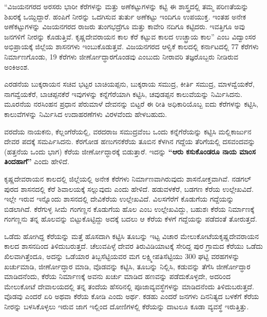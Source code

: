“ವಿಜಯನಗರದ ಅರಸರು ಭಾರೀ ಕೆರೆಗಳನ್ನು ಮತ್ತು ಅಣೆಕಟ್ಟುಗಳನ್ನು ಕಟ್ಟಿ ಈ ಶಾಸ್ತ್ರದಲ್ಲಿ ತಮ್ಮ ಪರಿಣತೆಯನ್ನು ಶಿಖರಕ್ಕೆ ಒಯ್ದಿದ್ದಾರೆ. ಹಂಪಿಗೆ ನೀರನ್ನು ಒದಗಿಸುವ ತುರ್ತು ಅಣೆಕಟ್ಟು ಇಂದಿಗೂ ಉಪಯುಕ್ತ. ಇಂತಹ ಅನೇಕ ಅಣೆಕಟ್ಟುಗಳನ್ನು ವಿಜಯನಗರದ ರಾಜರು ತುಂಗಭದ್ರೆಗೂ ಮತ್ತು ಕಾವೇರಿ ನದಿಗೂ ಕಟ್ಟಿದರು. ಇವತ್ತಿಗೂ ಅವು ಜನಗಳಿಗೆ ನೀರನ್ನು ಕೊಡುತ್ತಿವೆ. ಕೃಷ್ಣದೇವರಾಯನ ಕಾಲ ಕೆರೆ ಕಟ್ಟುವ ಕಾಲದ ಉಚ್ಛ್ರಾಯ ಕಾಲ” ಎಂಬ ವಿದ್ವಾಂಸರ ಅಭಿಪ್ರಾಯಕ್ಕೆ ಜಿಲ್ಲೆಯ ಶಾಸನಗಳು ಇಂಬುಕೊಡುತ್ತವೆ. ವಿಜಯನಗರದ ಆಳ್ವಿಕೆ ಕಾಲದಲ್ಲಿ ಕರ್ನಾಟದಲ್ಲಿ 77 ಕೆರೆಗಳು ನಿರ್ಮಾಣಗೊಂಡು, 19 ಕೆರೆಗಳು ಜೀರ್ಣೋದ್ಧಾರಗೊಂಡವು ಎಂಬುದು ನೀರಾವರಿ ತಜ್ಞರೊಬ್ಬರು ನೀಡಿರುವ ಅಂಕಿಅಂಶ.

ಎರಡನೆಯ ಬುಕ್ಕರಾಯನ ಸಚಿವ ಭಟ್ಟರ ಬಾಚಿಯಪ್ಪನು, ಬುಕ್ಕರಾಯ ಸಮುದ್ರ, ಕೀರ್ತಿ ಸಮುದ್ರ, ಮಾಳವ್ವೆಯಕೆರೆ, ನಾಗವ್ವೆಯಕೆರೆ, ಬಾಚಪ್ಪನಕೆರೆ ಇವುಗಳನ್ನು ಕನ್ನೆಗೆರೆಯಾಗಿ ಕಟ್ಟಿಸಿ, ಚವುಡಪ್ಪನ ಕಾಲುವೆಯನ್ನು ನಿರ್ಮಿಸಿದನು. ಮೂರನೆಯ ನರಸಿಂಹನ ಪ್ರಧಾನ ಪೆರುಮಾಳೆ ದೇವನನ್ನು ಬಿಟ್ಟರೆ ಈ ರೀತಿ ಅಧಿಕಾರಿಯೊಬ್ಬ ಐದು ಕೆರೆಗಳನ್ನು ಕಟ್ಟಿಸಿ, ಕಾಲುವೆಗಳನ್ನು ನಿರ್ಮಿಸಿದ ಉದಾಹರಣೆಗಳು ವಿರಳವೆಂದು ಹೇಳಬಹುದು.

ವರದೆಯ ನಾಯಕನು, ಕೆಲ್ಲಂಗೆರೆಯಲ್ಲಿ, ವರದರಾಜ ಸಮುದ್ರವೆಂಬ ಒಂದು ಕನ್ನೆಗೆರೆಯನ್ನು ಕಟ್ಟಿಸಿ ಮಲ್ಲಿಕಾರ್ಜುನ ದೇವರ ಪದಕ್ಕೆ ಸಮರ್ಪಿಸಿದನು. ಕೆರಗೋಡ ಹಣುಗನಕೆರೆಯ ತೂಬಿನ ಕೆಳಗಿನ ಗದ್ದೆಯ ತೆರಿಗೆಯಲ್ಲಿ ದಸವಂದವನ್ನು (ಹತ್ತನೆಯ ಒಂದು ಭಾಗ) ಕೆರೆಯ ಜೀರ್ಣೋದ್ಧಾರಕ್ಕೆ ಬಿಡುತ್ತಾರೆ. ಇದನ್ನು \textbf{“ಆರು ಕಸುಕೊಂಡರೂ ನಾಯ ಮಾಂಸ ತಿಂದಹಾಗೆ” }ಎಂದು ಹೇಳಿದೆ.

ಕೃಷ್ಣದೇವರಾಯನ ಕಾಲದಲ್ಲಿ ಜಿಲ್ಲೆಯಲ್ಲಿ ಅನೇಕ ಕೆರೆಗಳು ನಿರ್ಮಾಣವಾಗಿರುವುದು ಶಾಸನೋಕ್ತವಾಗಿವೆ. ನಡಗಲ್​ಪುರದ ಶಾಸನದಲ್ಲಿ ಕೆರೆ ಶಿವಾಲಯಕ್ಕೆ ಸಲ್ಲುವುದು ಎಂದು ಹೇಳಿದೆ. ಹಡುವಳಕೆರೆ, ಬಡಗಣ ಕೆರೆಯ ಉಲ್ಲೇಖವಿದೆ. ಇಲ್ಲೇ ಇರುವ ಇನ್ನೊಂದು ಶಾಸನದಲ್ಲಿ ದೇವಿಕೆರೆಯ ಉಲ್ಲೇಖವಿದೆ. ವಿಲಸಗೆರೆಗೆ ಕೊಡುಗೆಯ ಗದ್ದೆಯನ್ನು ಬಿಡಲಾಗಿದೆ. ಕೆರೆಗುಳ್ಳ ಸೀಮೆ ಗಂಗಣ್ಣನ ಕೊಡುಗೆಯ ಹೊಲ ಎಂಬ ಉಲ್ಲೇಖವಿದ್ದು, ಬಹುಶಃ ಕೆರೆಯ ನಿರ್ಮಾಣಕ್ಕೆ ಗಂಗಣ್ಣನು ತನ್ನ ಹೊಲವನ್ನು ಬಿಟ್ಟುಕೊಟ್ಟಿದ್ದು ಅದಕ್ಕೆ ಬದಲು ಆ ಕೆರೆಯ ಕೆಳಗೆ ಗದ್ದೆಯನ್ನು ಪಡೆದಂತೆ ತೋರುತ್ತದೆ.

ಒಡೆದು ಹೋಗಿದ್ದ ಕೆರೆಯನ್ನು ಮತ್ತೆ ಹೊಸದಾಗಿ ಕಟ್ಟಿಸಿ ತೂಬನ್ನು ಇಟ್ಟ ವಿಚಾರ ಮೇಲುಕೋಟೆಯ\break ಕೃಷ್ಣದೇವರಾಯನ ಕಾಲದ ಶಾಸನದಿಂದ ತಿಳಿದುಬರುತ್ತದೆ. ಚೆಲುವಪಿಳ್ಳೆ ದೇವರ ತಿರುವಿಡಿಯಾಟಕ್ಕೆ ಸೇರಿದ್ದ ಪುರ ಗ್ರಾಮದ ಕೆರೆಯು ಒಡೆದು ಖಿಲವಾಗಿತ್ತೆಂದೂ, ಅದನ್ನು ಒಡೆಯಾರ ತಿಬ್ಬಸೆಟ್ಟಿಯವರ ಮಗ ಲಕ್ಷ್ಮೀಪತಿಸೆಟ್ಟಿಯು 300 ಘಟ್ಟಿ ವರಹಗಳನ್ನು ಖರ್ಚುಮಾಡಿ, ಜೀರ್ಣೋದ್ಧಾರ ಮಾಡಿ, ವೊಡವನ್ನು ಕಟ್ಟಿಸಿ, ತೂಬನ್ನು ನಿಲ್ಲಿಸಿ, ಕಡುವನ್ನು ತೆಗೆಸಿ ಜೀರ್ಣೋದ್ಧಾರ ಮಾಡಿದನೆಂದು, ಕೆರೆಯ ನಿರ್ಮಾಣಕ್ಕೆ ಅವನು ಖರ್ಚು ಮಾಡಿದ ಹಣವನ್ನು ಪಡೆದುಕೊಳ್ಳದೇ, ಅದರಿಂದ ಮೇಲುಕೋಟೆ ದೇವಾಲಯದಲ್ಲಿ ತನ್ನ ತಂದೆಯ ಹೆಸರಿನಲ್ಲಿ ಪೂಜಾವ್ಯವಸ್ಥೆಗಳನ್ನು ಮಾಡಿದನೆಂದು ತಿಳಿದುಬರುತ್ತದೆ. ವೊಡವು ಎಂದರೆ ಏರಿ ಅಥವಾ ಕೆರೆಯ ಕೋಡಿ ಎಂದು ಅರ್ಥ. ಕಡಹು ಎಂದರೆ ಜನಗಳು ದಿನನಿತ್ಯದ ಬಳಕೆಗೆ ಕೆರೆಯ ನೀರನ್ನು ಬಳಸಿಕೊಳ್ಳಲು ಇರುವ ಜಾಗ ಇಲ್ಲಿಂದ ದೋಣಿಗಳಲ್ಲಿ ಕೆರೆಯನ್ನು ದಾಟಲೂ ಕೂಡಾ ವ್ಯವಸ್ಥೆ ಇರುತ್ತಿತ್ತು.

